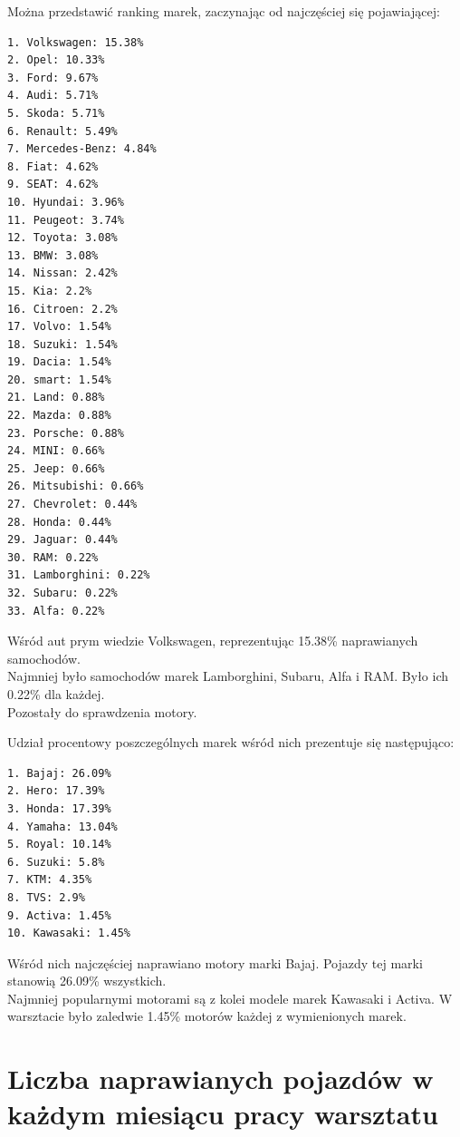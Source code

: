 \documentclass{article}\usepackage[]{graphicx}\usepackage[]{xcolor}
\begin{document}
Można przedstawić ranking marek, zaczynając od najczęściej się pojawiającej:

\begin{verbatim}
1. Volkswagen: 15.38%
2. Opel: 10.33%
3. Ford: 9.67%
4. Audi: 5.71%
5. Skoda: 5.71%
6. Renault: 5.49%
7. Mercedes-Benz: 4.84%
8. Fiat: 4.62%
9. SEAT: 4.62%
10. Hyundai: 3.96%
11. Peugeot: 3.74%
12. Toyota: 3.08%
13. BMW: 3.08%
14. Nissan: 2.42%
15. Kia: 2.2%
16. Citroen: 2.2%
17. Volvo: 1.54%
18. Suzuki: 1.54%
19. Dacia: 1.54%
20. smart: 1.54%
21. Land: 0.88%
22. Mazda: 0.88%
23. Porsche: 0.88%
24. MINI: 0.66%
25. Jeep: 0.66%
26. Mitsubishi: 0.66%
27. Chevrolet: 0.44%
28. Honda: 0.44%
29. Jaguar: 0.44%
30. RAM: 0.22%
31. Lamborghini: 0.22%
32. Subaru: 0.22%
33. Alfa: 0.22%
\end{verbatim}

Wśród aut prym wiedzie Volkswagen, reprezentując  15.38\% naprawianych samochodów. \\

Najmniej było samochodów marek Lamborghini, Subaru, Alfa i RAM. Było ich 0.22\% dla każdej. \\

Pozostały do sprawdzenia motory.



Udział procentowy poszczególnych marek wśród nich prezentuje się następująco:

\begin{verbatim}
1. Bajaj: 26.09%
2. Hero: 17.39%
3. Honda: 17.39%
4. Yamaha: 13.04%
5. Royal: 10.14%
6. Suzuki: 5.8%
7. KTM: 4.35%
8. TVS: 2.9%
9. Activa: 1.45%
10. Kawasaki: 1.45%
\end{verbatim}

Wśród nich najczęściej naprawiano motory marki Bajaj. Pojazdy tej marki stanowią 26.09\% wszystkich. \\

Najmniej popularnymi motorami są z kolei modele marek Kawasaki i Activa. W warsztacie było zaledwie 1.45\% motorów każdej z wymienionych marek.

\section{Liczba naprawianych pojazdów w każdym miesiącu pracy warsztatu}
\end{document}
